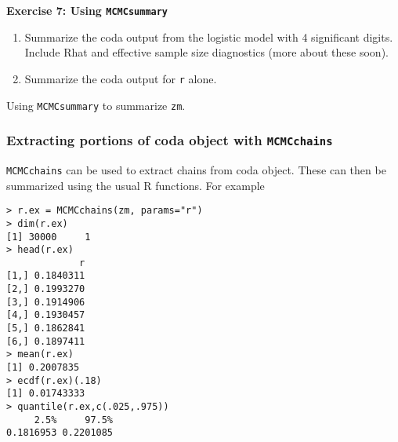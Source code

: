 \documentclass[12pt,english]{article}
\begin{document}
\bigskip
\belowcaptionskip=-20pt
\begin{exercise}
\begin{mdframed}
\doublespacing
\textbf{Exercise 7: Using \texttt{MCMCsummary}} 
\begin{enumerate}
\item Summarize the coda output from the logistic model with 4 significant digits.  Include Rhat and effective sample size diagnostics (more about these soon). 
\item Summarize the coda output for  \texttt{r} alone.  
\end{enumerate}
\end{mdframed}
\captionsetup{textformat=empty, labelformat=empty}
\caption[Using \texttt{MCMCsummary} to summarize \texttt{zm}]{Using \texttt{MCMCsummary} to summarize \texttt{zm}.}
\label{ex:MCMCsummary}
\end{exercise}
\belowcaptionskip=0pt


\subsubsection{Extracting portions of coda object with \texttt{MCMCchains}}

\texttt{MCMCchains} can be used to extract chains from coda object.  These can then be summarized using the usual R functions. For example

\begin{Verbatim}
> r.ex = MCMCchains(zm, params="r")
> dim(r.ex)
[1] 30000     1
> head(r.ex)
             r
[1,] 0.1840311
[2,] 0.1993270
[3,] 0.1914906
[4,] 0.1930457
[5,] 0.1862841
[6,] 0.1897411
> mean(r.ex)
[1] 0.2007835
> ecdf(r.ex)(.18)
[1] 0.01743333
> quantile(r.ex,c(.025,.975))
     2.5%     97.5% 
0.1816953 0.2201085
 \end{Verbatim}
\end{document}
